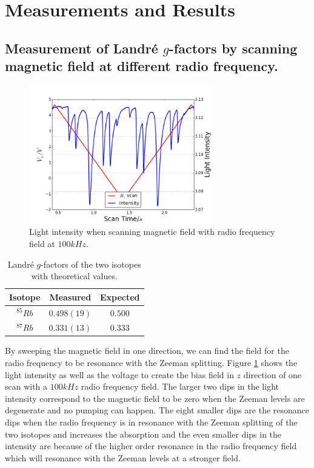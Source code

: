 \documentclass[aps,twocolumn,secnumarabic,balancelastpage,amsmath,amssymb,nofootinbib]{revtex4}
\begin{document}
\section{Measurements and Results}
\subsection{Measurement of Landr\'e $g$-factors by scanning magnetic field at different radio frequency.}
\begin{figure}
  \includegraphics[width=8cm]{../bscan_nf/03-15-bscan_nf_rf1.png}
  \caption{Light intensity when scanning magnetic field with radio frequency field at $100kHz$.}
  \label{bscan_raw}
\end{figure}
\begin{table}
  \begin{tabular}{|c|c|c|}
    \hline
    Isotope&Measured&Expected\\\hline
    ${}^{85}Rb$&$0.498(19)$&$0.500$\\\hline
    ${}^{87}Rb$&$0.331(13)$&$0.333$\\\hline
  \end{tabular}
  \caption{Landr\'e $g$-factors of the two isotopes with theoretical values.}
  \label{g_factor_res}
\end{table}
By sweeping the magnetic field in one direction, we can find the field for the radio frequency to be resonance with the Zeeman splitting. Figure \ref{bscan_raw} shows the light intensity as well as the voltage to create the bias field in $z$ direction of one scan with a $100kHz$ radio frequency field. The larger two dips in the light intensity correspond to the magnetic field to be zero when the Zeeman levels are degenerate and no pumping can happen. The eight smaller dips are the resonance dips when the radio frequency is in resonance with the Zeeman splitting of the two isotopes and increases the absorption and the even smaller dips in the intensity are because of the higher order resonance in the radio frequency field which will resonance with the Zeeman levels at a stronger field.
\end{document}

